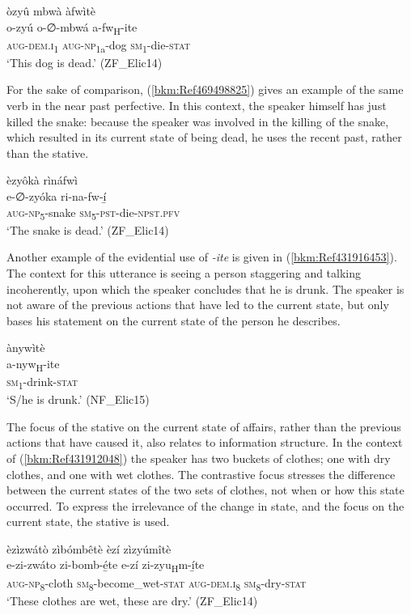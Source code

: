 \ea
\label{bkm:Ref71288039}
òzyû mbwà àfwìtè\\
\gll o-zyú    o-∅-mbwá    a-fw\textsubscript{H}-ite\\
\textsc{aug}-\textsc{dem}.\textsc{i}\textsubscript{1}  \textsc{aug}-\textsc{np}\textsubscript{1a}-dog  \textsc{sm}\textsubscript{1}-die-\textsc{stat}\\
\glt ‘This dog is dead.’ (ZF\_Elic14)
\z

For the sake of comparison, (\ref{bkm:Ref469498825}) gives an example of the same verb in the near past perfective. In this context, the speaker himself has just killed the snake: because the speaker was involved in the killing of the snake, which resulted in its current state of being dead, he uses the recent past, rather than the stative.

\ea
\label{bkm:Ref469498825}
èzyôkà rìnáfwì\\
\gll e-∅-zyóka    ri-na-fw-í̲\\
\textsc{aug}-\textsc{np}\textsubscript{5}-snake  \textsc{sm}\textsubscript{5}-\textsc{pst}-die-\textsc{npst}.\textsc{pfv}\\
\glt ‘The snake is dead.’ (ZF\_Elic14)
\z

Another example of the evidential use of \textit{-ite} is given in (\ref{bkm:Ref431916453}). The context for this utterance is seeing a person staggering and talking incoherently, upon which the speaker concludes that he is drunk. The speaker is not aware of the previous actions that have led to the current state, but only bases his statement on the current state of the person he describes.

\ea
\label{bkm:Ref431916453}
\glll ànywìtè\\
a-nyw\textsubscript{H}-ite\\
\textsc{sm}\textsubscript{1}-drink-\textsc{stat}\\
\glt ‘S/he is drunk.’ (NF\_Elic15)
\z

The focus of the stative on the current state of affairs, rather than the previous actions that have caused it, also relates to information structure. In the context of (\ref{bkm:Ref431912048}) the speaker has two buckets of clothes; one with dry clothes, and one with wet clothes. The contrastive focus stresses the difference between the current states of the two sets of clothes, not when or how this state occurred. To express the irrelevance of the change in state, and the focus on the current state, the stative is used.

\ea
\label{bkm:Ref431912048}
èzìzwátò zìbómbêtè èzí zìzyúmîtè\\
\gll e-zi-zwáto    zi-bomb-é̲te      e-zí    zi-zyu\textsubscript{H}m-í̲te\\
\textsc{aug}-\textsc{np}\textsubscript{8}-cloth  \textsc{sm}\textsubscript{8}-become\_wet-\textsc{stat}  \textsc{aug}-\textsc{dem}.\textsc{i}\textsubscript{8} \textsc{sm}\textsubscript{8}-dry-\textsc{stat}\\
\glt ‘These clothes are wet, these are dry.’ (ZF\_Elic14)
\z

